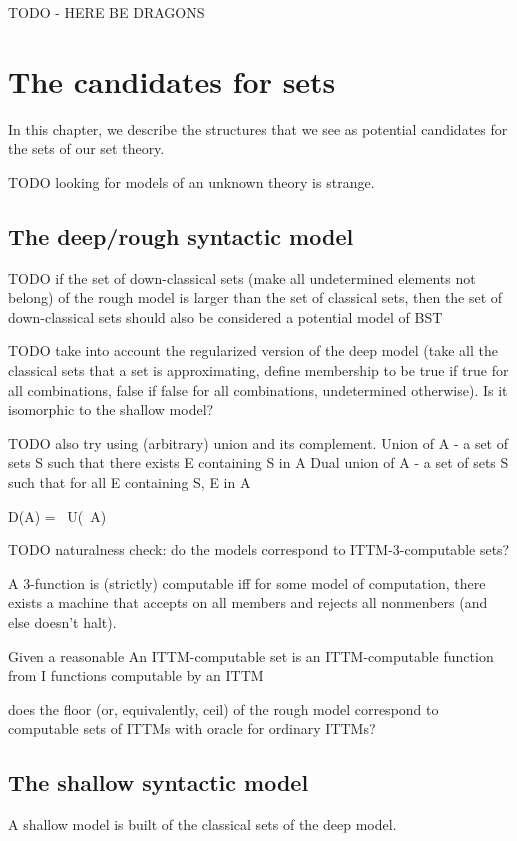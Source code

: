 \documentclass[oneside,12pt]{book}
\theoremstyle{definition}
\theoremstyle{remark}
\begin{document}
TODO - HERE BE DRAGONS

\chapter{The candidates for sets}
In this chapter, we describe the structures that we see as potential candidates
for the sets of our set theory.

TODO looking for models of an unknown theory is strange.

\section{The deep/rough syntactic model}

TODO if the set of down-classical sets (make all undetermined elements not belong)
of the rough model is larger than the set of classical sets, then the set of down-classical
sets should also be considered a potential model of BST

TODO take into account the regularized version of the deep model (take all the classical
sets that a set is approximating, define membership to be true if true for all combinations,
false if false for all combinations, undetermined otherwise). Is it isomorphic
to the shallow model?

TODO also try using (arbitrary) union and its complement.
Union of A - a set of sets S such that there exists E containing S in A
Dual union of A - a set of sets S such that for all E containing S, E in A

D(A) = ~U(~A)

TODO naturalness check: do the models correspond to ITTM-3-computable sets?

A 3-function is (strictly) computable iff for some model of computation,
there exists a machine that accepts on all members and rejects all nonmenbers
(and else doesn't halt).

Given a reasonable
An ITTM-computable set is an ITTM-computable function from I
functions
computable by an ITTM

does the floor (or, equivalently, ceil) of the rough model correspond to
computable sets of ITTMs with oracle for ordinary ITTMs?

\section{The shallow syntactic model}
A shallow model is built of the classical sets of the deep model.
\end{document}
